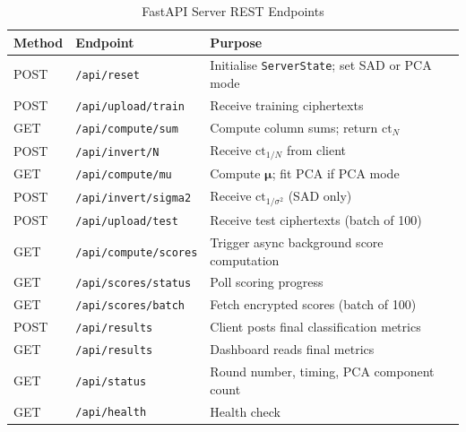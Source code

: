 \begin{table}[!ht]
\centering
\caption{FastAPI Server REST Endpoints}
\label{tab:api}
\begin{tabular}{llp{7cm}}
\toprule
\textbf{Method} & \textbf{Endpoint} & \textbf{Purpose} \\
\midrule
POST & \texttt{/api/reset} &
  Initialise \texttt{ServerState}; set SAD or PCA mode \\
POST & \texttt{/api/upload/train} &
  Receive training ciphertexts \\
GET  & \texttt{/api/compute/sum} &
  Compute column sums; return $\mathrm{ct}_N$ \\
POST & \texttt{/api/invert/N} &
  Receive $\mathrm{ct}_{1/N}$ from client \\
GET  & \texttt{/api/compute/mu} &
  Compute $\boldsymbol{\mu}$; fit PCA if PCA mode \\
POST & \texttt{/api/invert/sigma2} &
  Receive $\mathrm{ct}_{1/\sigma^2}$ (SAD only) \\
POST & \texttt{/api/upload/test} &
  Receive test ciphertexts (batch of 100) \\
GET  & \texttt{/api/compute/scores} &
  Trigger async background score computation \\
GET  & \texttt{/api/scores/status} &
  Poll scoring progress \\
GET  & \texttt{/api/scores/batch} &
  Fetch encrypted scores (batch of 100) \\
POST & \texttt{/api/results} &
  Client posts final classification metrics \\
GET  & \texttt{/api/results} &
  Dashboard reads final metrics \\
GET  & \texttt{/api/status} &
  Round number, timing, PCA component count \\
GET  & \texttt{/api/health} &
  Health check \\
\bottomrule
\end{tabular}
\end{table}

